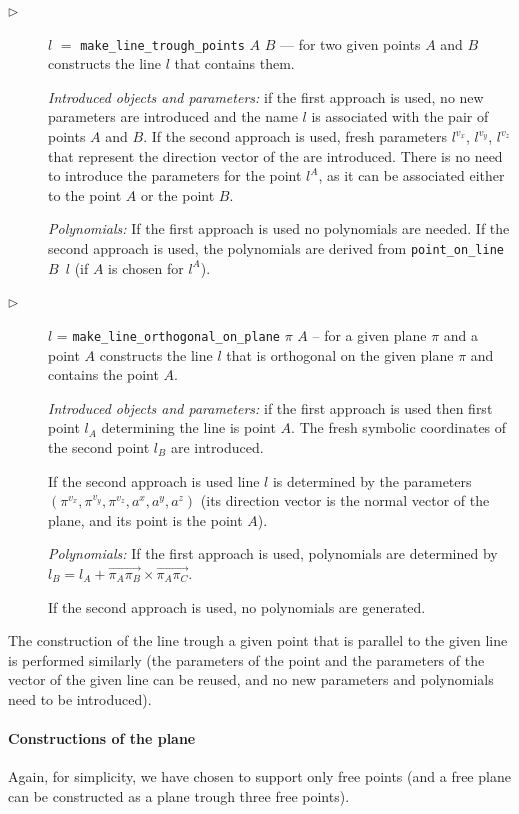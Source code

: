\documentclass[final,1p,times,authoryear]{elsarticle}
\begin{document}
\begin{description}
\item[$\triangleright$] $l$ $=$ {\tt make\_line\_trough\_points} $A$
  $B$ --- for two given points $A$ and $B$ constructs the line $l$
  that contains them.

  {\em Introduced objects and parameters:} if the first approach is
  used, no new parameters are introduced and the name $l$ is
  associated with the pair of points $A$ and $B$. If the second
  approach is used, fresh parameters $l^{v_x}$, $l^{v_y}$, $l^{v_z}$
  that represent the direction vector of the are introduced. There is
  no need to introduce the parameters for the point $l^A$, as it can
  be associated either to the point $A$ or the point $B$.

  {\em Polynomials:} If the first approach is used no polynomials are
  needed. If the second approach is used, the polynomials are derived
  from {\tt point\_on\_line $B$ $l$} (if $A$ is chosen for $l^A$).

\item[$\triangleright$] $l$ = {\tt make\_line\_orthogonal\_on\_plane}
  $\pi$ $A$ -- for a given plane $\pi$ and a point $A$ constructs the
  line $l$ that is orthogonal on the given plane $\pi$ and contains
  the point $A$.

  {\em Introduced objects and parameters:} if the first approach is
  used then first point $l_A$ determining the line is point $A$. The
  fresh symbolic coordinates of the second point $l_B$ are introduced.

  If the second approach is used line $l$ is determined by the
  parameters $(\pi^{v_x}, \pi^{v_y}, \pi^{v_z}, a^x, a^y, a^z)$ (its
  direction vector is the normal vector of the plane, and its point is
  the point $A$).

  {\em Polynomials:} If the first approach is used, polynomials are
  determined by
  $l_B = l_A + \overrightarrow{\pi_A\pi_B} \times
  \overrightarrow{\pi_A\pi_C}$.

  If the second approach is used, no polynomials are generated.
\end{description}

The construction of the line trough a given point that is parallel to
the given line is performed similarly (the parameters of the point and
the parameters of the vector of the given line can be reused, and no
new parameters and polynomials need to be introduced).


\paragraph{Constructions of the plane}
Again, for simplicity, we have chosen to support only free points (and
a free plane can be constructed as a plane trough three free points).
\end{document}
